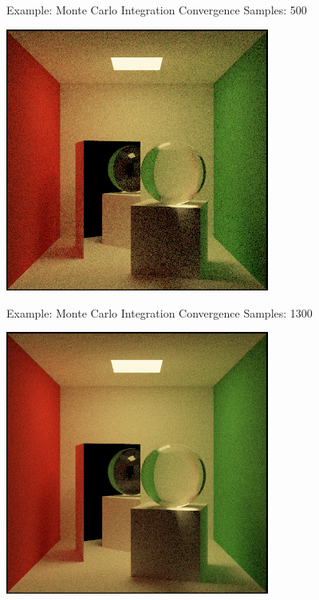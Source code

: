 \documentclass{beamer}
\begin{document}
\begin{frame}{Example: Monte Carlo Integration Convergence}
    Samples: 500
    \begin{center}
        \includegraphics[width=0.65\textwidth]{../img/convergence/cornell-00500.png}
    \end{center}
\end{frame}

\begin{frame}{Example: Monte Carlo Integration Convergence}
    Samples: 1300
    \begin{center}
        \includegraphics[width=0.65\textwidth]{../img/convergence/cornell-01300.png}
    \end{center}
\end{frame}
\end{document}

